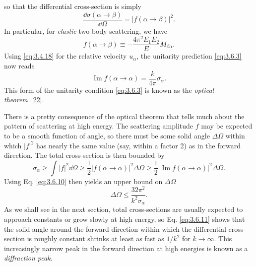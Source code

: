 so that the differential cross-section is simply
\begin{equation}
 \frac{\dd\sigma(\alpha\to\beta)}{\dd\Omega}=|f(\alpha\to\beta)|^2.
 \tag{3.6.8}\label{eq:3.6.8}
\end{equation}
In particular, for \emph{elastic} two-body scattering, we have
\begin{equation}
 f(\alpha\to\beta)\equiv-\frac{4\pi^2E_1E_2}{E}M_{\beta\alpha}.
 \tag{3.6.9}\label{eq:3.6.9}
\end{equation}
Using \eqref{eq:3.4.18} for the relative velocity $u_\alpha$, the unitarity prediction \eqref{eq:3.6.3} now reads
\begin{equation}
 \operatorname{Im}f(\alpha\to\alpha)=\frac{k}{4\pi}\sigma_\alpha.
 \tag{3.6.10}\label{eq:3.6.10}
\end{equation}
This form of the unitarity condition \eqref{eq:3.6.3} is known as the \emph{optical theorem}~\hyperref[ref:3.22]{[22]}.

There is a pretty consequence of the optical theorem that tells much about the pattern of
scattering at high energy. The scattering amplitude $f$ may be expected to be a smooth function
of angle, so there must be some solid angle $\Delta\Omega$ within which $|f|^2$ has nearly the
same value (say, within a factor 2) as in the forward direction. The total cross-section is then
bounded by
\[
 \sigma_\alpha\geq\int|f|^2\dd\Omega
 \geq\frac{1}{2}|f(\alpha\to\alpha)|^2\Delta\Omega
 \geq\frac{1}{2}|\operatorname{Im}f(\alpha\to\alpha)|^2\Delta\Omega.
\]
Using Eq. \eqref{eq:3.6.10} then yields an upper bound on $\Delta\Omega$
\begin{equation}
 \Delta\Omega\leq\frac{32\pi^2}{k^2\sigma_\alpha}.
 \tag{3.6.11}\label{eq:3.6.11}
\end{equation}
As we shall see in the next section, total cross-sections are usually expected to approach
constants or grow slowly at high energy, so Eq. \eqref{eq:3.6.11} shows that the solid angle around the
forward direction within which the differential cross-section is roughly constant shrinks at
least as fast as $1/k^2$ for $k\to\infty$. This increasingly narrow peak in the forward direction
at high energies is known as a \emph{diffraction peak}.

